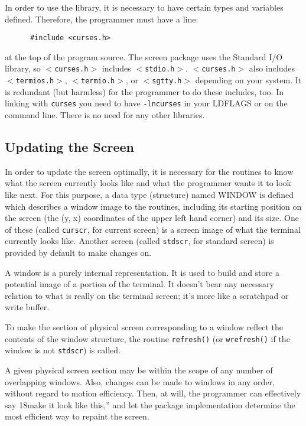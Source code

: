 \label{f0:compiling}In order to use the library, it is necessary to have certain types and
variables defined.  Therefore, the programmer must have a line:
\begin{verbatim} 	  #include <curses.h>
\end{verbatim}
at the top of the program source.  The screen package uses the Standard I/O
library, so \texttt{\mbox{$<$}curses.h\mbox{$>$}} includes
\texttt{\mbox{$<$}stdio.h\mbox{$>$}}. \texttt{\mbox{$<$}curses.h\mbox{$>$}} also includes
\texttt{\mbox{$<$}termios.h\mbox{$>$}}, \texttt{\mbox{$<$}termio.h\mbox{$>$}}, or
\texttt{\mbox{$<$}sgtty.h\mbox{$>$}} depending on your system.  It is redundant (but
harmless) for the programmer to do these includes, too. In linking with
\texttt{curses} you need to have \texttt{-lncurses} in your LDFLAGS or on the
command line.  There is no need for any other libraries.

\subsection{Updating the Screen}

\label{f0:updating}In order to update the screen optimally, it is necessary for the routines to
know what the screen currently looks like and what the programmer wants it to
look like next. For this purpose, a data type (structure) named WINDOW is
defined which describes a window image to the routines, including its starting
position on the screen (the (y, x) coordinates of the upper left hand corner)
and its size.  One of these (called \texttt{curscr}, for current screen) is a
screen image of what the terminal currently looks like.  Another screen (called
\texttt{stdscr}, for standard screen) is provided by default to make changes
on. 

A window is a purely internal representation. It is used to build and store a
potential image of a portion of the terminal.  It doesn't bear any necessary
relation to what is really on the terminal screen; it's more like a
scratchpad or write buffer. 

To make the section of physical screen corresponding to a window reflect the
contents of the window structure, the routine \texttt{refresh()} (or
\texttt{wrefresh()} if the window is not \texttt{stdscr}) is called. 

A given physical screen section may be within the scope of any number of
overlapping windows.  Also, changes can be made to windows in any order,
without regard to motion efficiency.  Then, at will, the programmer can
effectively say \char18make it look like this,'' and let the package implementation
determine the most efficient way to repaint the screen.

